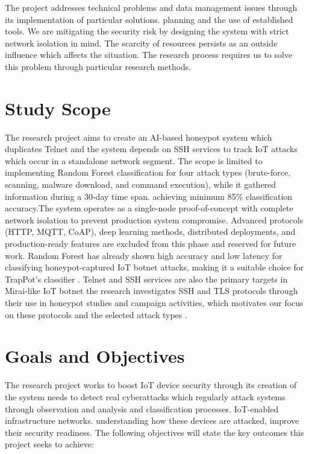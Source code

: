The project addresses technical problems and data management issues through its implementation of particular solutions. planning and the use of established tools. We are mitigating the security risk by designing the system with strict network isolation in mind. The scarcity of resources persists as an outside influence which affects the situation. The research process requires us to solve this problem through particular research methods. 

\section{Study Scope}
\label{sec:study_scope}

The research project aims to create an AI-based honeypot system which duplicates Telnet and the system depends on SSH services to track IoT attacks which occur in a standalone network segment. The scope is limited to implementing Random Forest classification for four attack types (brute-force, scanning, malware download, and command execution), while it gathered information during a 30-day time span. achieving minimum 85\% classification accuracy.The system operates as a single-node proof-of-concept with complete network isolation to prevent production system compromise. Advanced protocols (HTTP, MQTT, CoAP), deep learning methods, distributed deployments, and production-ready features are excluded from this phase and reserved for future work.
Random Forest has already shown high accuracy and low latency for classifying honeypot-captured IoT botnet attacks, making it a suitable choice for TrapPot’s classifier \cite{lee2021classification}. Telnet and SSH services are also the primary targets in Mirai-like IoT botnet the research investigates SSH and TLS protocols through their use in honeypot studies and campaign activities, which motivates our focus on these protocols and the selected attack types \cite{herwig2021analyzing,zhang2023identification}.

\section{Goals and Objectives}
\label{sec:goals_and_objectives}

The research project works to boost IoT device security through its creation of the system needs to detect real cyberattacks which regularly attack systems through observation and analysis and classification processes. IoT-enabled infrastructure networks. understanding how these devices are attacked, improve their security readiness. The following objectives will state the key outcomes this project seeks to achieve:

